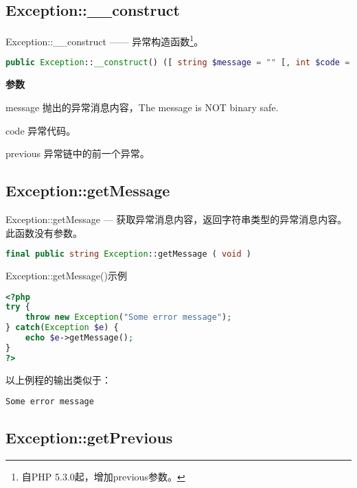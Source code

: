 \subsection{Exception::\_\_construct}


Exception::\_\_construct —— 异常构造函数\footnote{自PHP 5.3.0起，增加previous参数。}。


\begin{lstlisting}[language=PHP]
public Exception::__construct() ([ string $message = "" [, int $code = 0 [, Exception $previous = NULL ]]] )
\end{lstlisting}




\textbf{参数}

\begin{compactitem}
\item message
抛出的异常消息内容，The message is NOT binary safe.
\item code
异常代码。
\item previous
异常链中的前一个异常。
\end{compactitem}


\subsection{Exception::getMessage}

Exception::getMessage — 获取异常消息内容，返回字符串类型的异常消息内容。此函数没有参数。

\begin{lstlisting}[language=PHP]
final public string Exception::getMessage ( void )
\end{lstlisting}




\begin{example}
Exception::getMessage()示例
\begin{lstlisting}[language=PHP]
<?php
try {
    throw new Exception("Some error message");
} catch(Exception $e) {
    echo $e->getMessage();
}
?>
\end{lstlisting}
\end{example}

以上例程的输出类似于：

\begin{verbatim}
Some error message
\end{verbatim}

\subsection{Exception::getPrevious}

